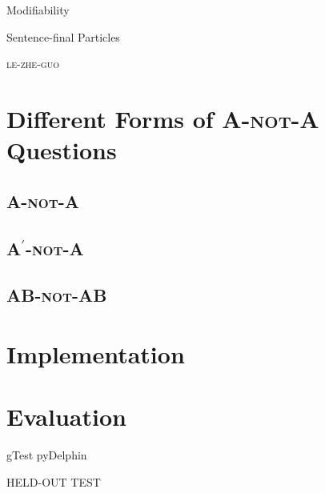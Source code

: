 \documentclass[11pt]{article}
\def\anota{\textsc{A-not-A}}
\begin{document}
Modifiability


Sentence-final Particles


\textsc{le-zhe-guo}




\section{Different Forms of {\anota} Questions}
\label{sec:forms}



\subsection{\textsc{A-not-A}}
\label{ssec:basic}



\subsection{\textsc{A\ensuremath{^\prime}-not-A}}
\label{ssec:contracted}



\subsection{\textsc{AB-not-AB}}
\label{ssec:phrasal}




\section{Implementation}
\label{sec:implemetation}


\section{Evaluation}
\label{sec:evaluation}

gTest 
pyDelphin


HELD-OUT
TEST











\end{document}
